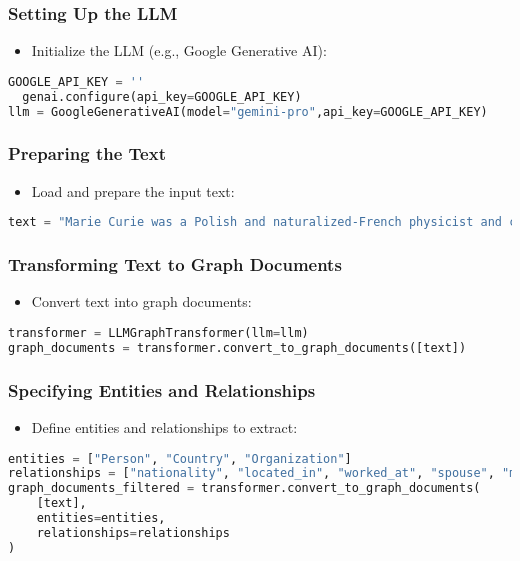 \begin{frame}[fragile]\frametitle{Setting Up the LLM}
  \begin{itemize}
    \item Initialize the LLM (e.g., Google Generative AI):
  \end{itemize}
  \begin{lstlisting}[language=python]
  GOOGLE_API_KEY = ''
  genai.configure(api_key=GOOGLE_API_KEY)
llm = GoogleGenerativeAI(model="gemini-pro",api_key=GOOGLE_API_KEY)
  \end{lstlisting}
\end{frame}

\begin{frame}[fragile]\frametitle{Preparing the Text}
  \begin{itemize}
    \item Load and prepare the input text:
  \end{itemize}
  \begin{lstlisting}[language=python]
text = "Marie Curie was a Polish and naturalized-French physicist and chemist..."
  \end{lstlisting}
\end{frame}

\begin{frame}[fragile]\frametitle{Transforming Text to Graph Documents}
  \begin{itemize}
    \item Convert text into graph documents:
  \end{itemize}
  \begin{lstlisting}[language=python]
transformer = LLMGraphTransformer(llm=llm)
graph_documents = transformer.convert_to_graph_documents([text])
  \end{lstlisting}
\end{frame}

\begin{frame}[fragile]\frametitle{Specifying Entities and Relationships}
  \begin{itemize}
    \item Define entities and relationships to extract:
  \end{itemize}
  \begin{lstlisting}[language=python]
entities = ["Person", "Country", "Organization"]
relationships = ["nationality", "located_in", "worked_at", "spouse", "mother"]
graph_documents_filtered = transformer.convert_to_graph_documents(
    [text], 
    entities=entities, 
    relationships=relationships
)
  \end{lstlisting}
\end{frame}

